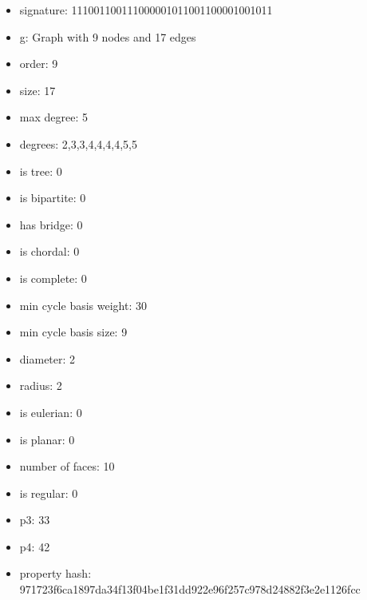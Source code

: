 \newpage
\begin{figure}
\end{figure}
\begin{itemize}
\item signature: 111001100111000001011001100001001011
\item g: Graph with 9 nodes and 17 edges
\item order: 9
\item size: 17
\item max degree: 5
\item degrees: 2,3,3,4,4,4,4,5,5
\item is tree: 0
\item is bipartite: 0
\item has bridge: 0
\item is chordal: 0
\item is complete: 0
\item min cycle basis weight: 30
\item min cycle basis size: 9
\item diameter: 2
\item radius: 2
\item is eulerian: 0
\item is planar: 0
\item number of faces: 10
\item is regular: 0
\item p3: 33
\item p4: 42
\item property hash: 971723f6ca1897da34f13f04be1f31dd922e96f257c978d24882f3e2e1126fcc
\end{itemize}
